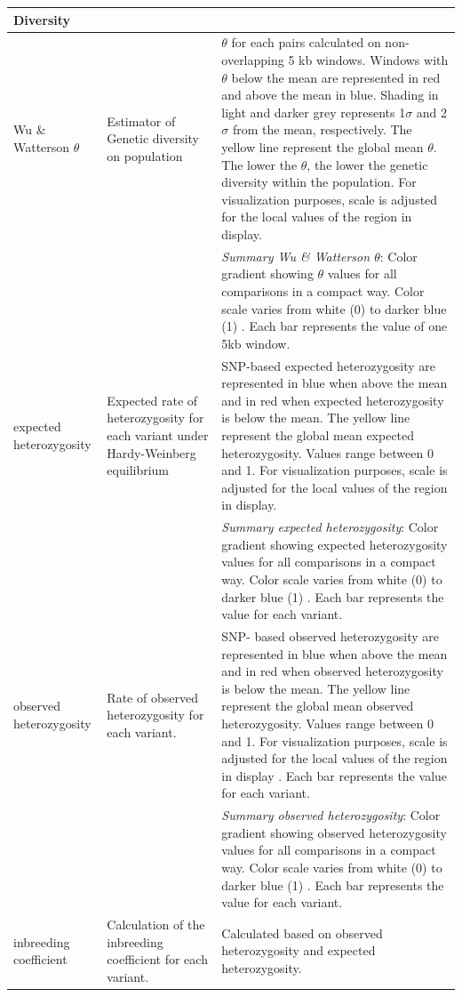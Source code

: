 \documentclass[9pt,twocolumn,twoside]{celabRxiv}
\begin{document}
\begin{longtable}{p{3cm}p{6cm}p{8cm}}
\textbf{Diversity} & & \\
\hline
Wu \& Watterson $\theta$ & Estimator of Genetic diversity on population \citet{watterson1975number}& $\theta$ for each pairs calculated on non-overlapping 5 kb windows. Windows with $\theta$ below the mean are represented in red and above the mean in blue. Shading in light and darker grey represents 1$\sigma$ and 2$\sigma$ from the mean, respectively. The yellow line represent the global mean $\theta$. The lower the $\theta$, the lower the genetic diversity within the population. For visualization purposes, scale is adjusted for the local values of the region in display. \\
& & 	\textit{Summary Wu \& Watterson $\theta$}: Color gradient showing $\theta$ values for all comparisons in a compact way. Color scale varies from white (0) to darker blue (1) . Each bar represents the value of one 5kb window.\\
expected heterozygosity	& Expected rate of heterozygosity for each variant under Hardy-Weinberg equilibrium & SNP-based expected heterozygosity are represented in blue when above the mean and in red when expected heterozygosity is below the mean. The yellow line represent the global mean expected heterozygosity. Values range between 0 and 1. For visualization purposes, scale is adjusted for the local values of the region in display. \\
& & 	\textit{Summary expected heterozygosity}: Color gradient showing expected heterozygosity values for all comparisons in a compact way. Color scale varies from white (0) to darker blue (1) . Each bar represents the value for each variant.\\
observed heterozygosity	& Rate of observed heterozygosity for each variant. & SNP- based observed heterozygosity are represented in blue when above the mean and in red when observed heterozygosity is below the mean. The yellow line represent the global mean observed heterozygosity. Values range between 0 and 1. For visualization purposes, scale is adjusted for the local values of the region in display .
Each bar represents the value for each variant.\\
& & 	\textit{Summary observed heterozygosity}: Color gradient showing observed heterozygosity values for all comparisons in a compact way. Color scale varies from white (0) to darker blue (1) . Each bar represents the value for each variant.\\
inbreeding coefficient	& Calculation of the inbreeding coefficient for each variant. & Calculated based on observed heterozygosity and expected heterozygosity.

\end{longtable}
\end{document}
